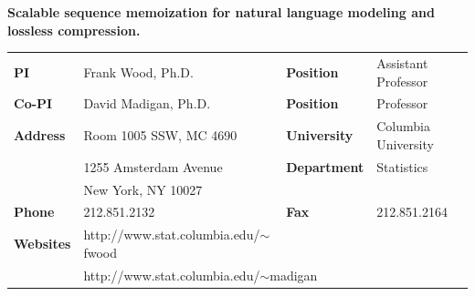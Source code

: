 \documentclass[10pt]{article}
\begin{document}
\begin{center} \bf \Large Scalable sequence memoization for natural language modeling and lossless compression.\end{center}
%

%
\begin{center}
\begin{tabular}{llll}
{\bf PI }& Frank Wood, Ph.D. &{\bf Position }& Assistant Professor\\
{\bf Co-PI}& David Madigan, Ph.D. &{\bf Position  }& Professor\\
{\bf Address} & Room 1005 SSW, MC 4690 & {\bf University} & Columbia University \\
&1255 Amsterdam Avenue & {\bf Department }& Statistics \\
&New York, NY 10027 \\
 {\bf Phone} & 212.851.2132& {\bf Fax} & 212.851.2164 \\
 {\bf Websites} &{http://www.stat.columbia.edu/$\sim$fwood}\\
 & \multicolumn{2}{l}{http://www.stat.columbia.edu/$\sim$madigan}
\end{tabular}
\end{center}
\end{document}
